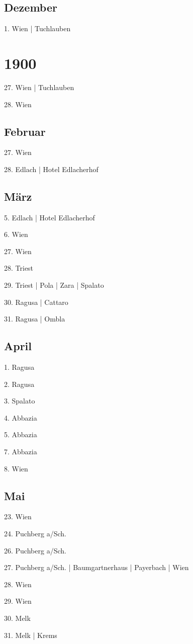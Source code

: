 \documentclass[twoside=false,titlepage=false,open=any, parskip=never, fontsize=10pt, headings=small, chapterprefix=false, appendixprefix=false, DIV=15]{scrbook}
\begin{document}
\begin{multicols}{3}
            \section*{Dezember}
            1. Wien | Tuchlauben\par
            \chapter*{1900}
            27. Wien | Tuchlauben\par
            28. Wien\par
            \section*{Februar}
            27. Wien\par
            28. Edlach | Hotel Edlacherhof\par
            \section*{März}
            5. Edlach | Hotel Edlacherhof\par
            6. Wien\par
            27. Wien\par
            28. Triest\par
            29. Triest | Pola | Zara | Spalato\par
            30. Ragusa | Cattaro\par
            31. Ragusa | Ombla\par
            \section*{April}
            1. Ragusa\par
            2. Ragusa\par
            3. Spalato\par
            4. Abbazia\par
            5. Abbazia\par
            7. Abbazia\par
            8. Wien\par
            \section*{Mai}
            23. Wien\par
            24. Puchberg a/Sch.\par
            26. Puchberg a/Sch.\par
            27. Puchberg a/Sch. | Baumgartnerhaus | Payerbach | Wien\par
            28. Wien\par
            29. Wien\par
            30. Melk\par
            31. Melk | Krems\par

\end{multicols}
\end{document}
